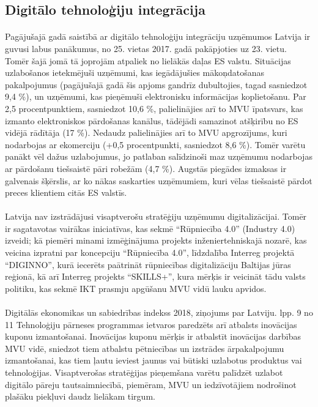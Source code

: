 \subsection{Digitālo tehnoloģiju integrācija}
\paragraph{}
Pagājušajā gadā saistībā ar digitālo tehnoloģiju integrāciju uzņēmumos Latvija ir guvusi
labus panākumus, no 25. vietas 2017. gadā pakāpjoties uz 23. vietu. Tomēr šajā jomā tā
joprojām atpaliek no lielākās daļas ES valstu. Situācijas uzlabošanos ietekmējuši uzņēmumi,
kas iegādājušies mākoņdatošanas pakalpojumus (pagājušajā gadā šis apjoms gandrīz
dubultojies, tagad sasniedzot 9,4 \%), un uzņēmumi, kas pieņēmuši elektronisku informācijas
koplietošanu. Par 2,5 procentpunktiem, sasniedzot 10,6 \%, palielinājies arī to MVU īpatsvars,
kas izmanto elektroniskos pārdošanas kanālus, tādējādi samazinot atšķirību no ES vidējā
rādītāja (17 \%). Nedaudz palielinājies arī to MVU apgrozījums, kuri nodarbojas ar ekomerciju 
(+0,5 procentpunkti, sasniedzot 8,6 \%). Tomēr varētu panākt vēl dažus
uzlabojumus, jo patlaban salīdzinoši maz uzņēmumu nodarbojas ar pārdošanu tiešsaistē pāri
robežām (4,7 \%). Augstās piegādes izmaksas ir galvenais šķērslis, ar ko nākas saskarties
uzņēmumiem, kuri vēlas tiešsaistē pārdot preces klientiem citās ES valstīs.
\paragraph{}
Latvija nav izstrādājusi visaptverošu stratēģiju uzņēmumu digitalizācijai. Tomēr ir
sagatavotas vairākas iniciatīvas, kas sekmē “Rūpniecība 4.0” (Industry 4.0) izveidi; kā
piemēri minami izmēģinājuma projekts inženiertehniskajā nozarē, kas veicina izpratni par
koncepciju “Rūpniecība 4.0”, līdzdalība Interreg projektā “DIGINNO”, kurā iecerēts paātrināt
rūpniecības digitalizāciju Baltijas jūras reģionā, kā arī Interreg projekts “SKILLS+”, kura
mērķis ir veicināt tādu valsts politiku, kas sekmē IKT prasmju apgūšanu MVU vidū lauku
apvidos.
\paragraph{}
Digitālās ekonomikas un sabiedrības indekss 2018, ziņojums par Latviju. lpp. 9 no 11
Tehnoloģiju pārneses programmas ietvaros paredzēts arī atbalsts inovācijas kuponu
izmantošanai. Inovācijas kuponu mērķis ir atbalstīt inovācijas darbības MVU vidē, sniedzot
tiem atbalstu pētniecības un izstrādes ārpakalpojumu izmantošanai, kas tiem ļautu ieviest
jaunus vai būtiski uzlabotus produktus vai tehnoloģijas.
Visaptverošas stratēģijas pieņemšana varētu palīdzēt uzlabot digitālo pāreju
tautsaimniecībā, piemēram, MVU un iedzīvotājiem nodrošinot plašāku piekļuvi daudz
lielākam tirgum.